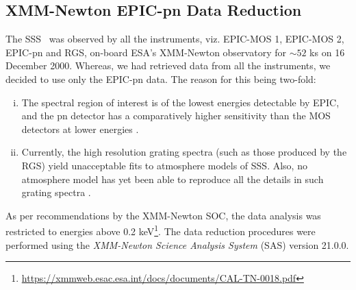 	    \subsection{XMM-Newton EPIC-pn Data Reduction} \label{multi-obs:red-analysis:epic-pn}
    		The SSS \source\ was observed by all the instruments, viz. EPIC-MOS 1, EPIC-MOS 2, EPIC-pn and RGS, on-board ESA's XMM-Newton observatory for $\sim 52$ ks on 16 December 2000. Whereas, we had retrieved data from all the instruments, we decided to use only the EPIC-pn data. The reason for this being two-fold:
	    	\begin{enumerate}[i.]
	    		\item The spectral region of interest is of the lowest energies detectable by EPIC, and the pn detector has a comparatively higher sensitivity than the MOS detectors at lower energies \cite{stecchini2023revisiting,mateos2009statistical}.
	    		\item Currently, the high resolution grating spectra (such as those produced by the RGS) yield unacceptable fits to atmosphere models of SSS. Also, no atmosphere model has yet been able to reproduce all the details in such grating spectra \cite{ness2020complications}.
	    	\end{enumerate}
	    	As per recommendations by the XMM-Newton SOC, the data analysis was restricted to energies above 0.2 keV\footnote{\url{https://xmmweb.esac.esa.int/docs/documents/CAL-TN-0018.pdf}}. The data reduction procedures were performed using the \textit{XMM-Newton Science Analysis System} (SAS) version 21.0.0.
	    
